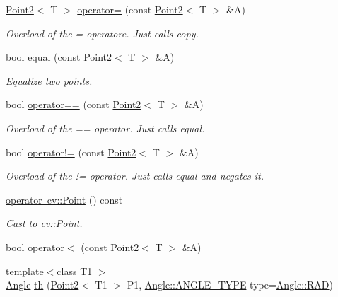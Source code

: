 \begin{DoxyCompactItemize}
\mbox{\hyperlink{class_point2}{Point2}}$<$ T $>$ \mbox{\hyperlink{class_point2_af715722f2b04def60eb23f291e31c4d8}{operator=}} (const \mbox{\hyperlink{class_point2}{Point2}}$<$ T $>$ \&A)
\begin{DoxyCompactList}\small\item\em Overload of the = operatore. Just calls {\ttfamily copy}. \end{DoxyCompactList}\item 
bool \mbox{\hyperlink{class_point2_a8ecda76875462077d1396319c8a582d5}{equal}} (const \mbox{\hyperlink{class_point2}{Point2}}$<$ T $>$ \&A)
\begin{DoxyCompactList}\small\item\em Equalize two points. \end{DoxyCompactList}\item 
bool \mbox{\hyperlink{class_point2_af58b2b05b59316580b3989b0548afade}{operator==}} (const \mbox{\hyperlink{class_point2}{Point2}}$<$ T $>$ \&A)
\begin{DoxyCompactList}\small\item\em Overload of the == operator. Just calls {\ttfamily equal}. \end{DoxyCompactList}\item 
bool \mbox{\hyperlink{class_point2_ad671e757853f5d7d5431d011d9e94b03}{operator!=}} (const \mbox{\hyperlink{class_point2}{Point2}}$<$ T $>$ \&A)
\begin{DoxyCompactList}\small\item\em Overload of the != operator. Just calls {\ttfamily equal} and negates it. \end{DoxyCompactList}\item 
\mbox{\hyperlink{class_point2_a0d3f17f7d86d02eae126aa329a20861a}{operator cv\+::\+Point}} () const
\begin{DoxyCompactList}\small\item\em Cast to cv\+::\+Point. \end{DoxyCompactList}\item 
bool \mbox{\hyperlink{class_point2_a636a84c47519a482cfce43039e981dff}{operator$<$}} (const \mbox{\hyperlink{class_point2}{Point2}}$<$ T $>$ \&A)
\item 
{\footnotesize template$<$class T1 $>$ }\\\mbox{\hyperlink{class_angle}{Angle}} \mbox{\hyperlink{class_point2_a0ef2bb867cce9a4f184f00af809bc766}{th}} (\mbox{\hyperlink{class_point2}{Point2}}$<$ T1 $>$ P1, \mbox{\hyperlink{class_angle_a4f7b9849ce8780bcba95ca3ee45cff77}{Angle\+::\+A\+N\+G\+L\+E\+\_\+\+T\+Y\+PE}} type=\mbox{\hyperlink{class_angle_a4f7b9849ce8780bcba95ca3ee45cff77a93ab6b68075fd7a6fe724fbde5b13c1f}{Angle\+::\+R\+AD}})
\end{DoxyCompactItemize}
